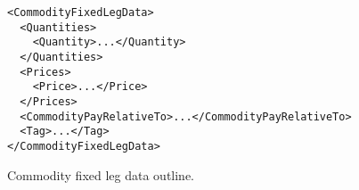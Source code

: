 \begin{listing}[h!]
\begin{verbatim}
<CommodityFixedLegData>
  <Quantities>
    <Quantity>...</Quantity>
  </Quantities>
  <Prices>
    <Price>...</Price>
  </Prices>
  <CommodityPayRelativeTo>...</CommodityPayRelativeTo>
  <Tag>...</Tag>
</CommodityFixedLegData>
\end{verbatim}
\caption{Commodity fixed leg data outline.}
\label{lst:commodity_fixed_leg_data}
\end{listing}
